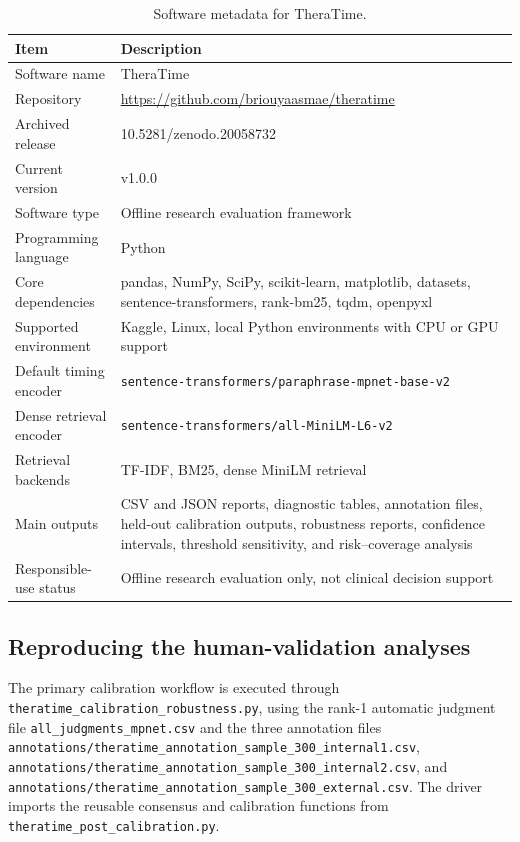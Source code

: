 \documentclass[preprint,12pt,a4paper]{elsarticle}
\newcommand{\theratimeRepository}{\url{https://github.com/briouyaasmae/theratime}}
\newcommand{\theratimeZenodo}{10.5281/zenodo.20058732}
\begin{document}
\begin{table}
\centering
\footnotesize
\caption{Software metadata for TheraTime.}
\label{tab:metadata}
\setlength{\tabcolsep}{6pt}
\renewcommand{\arraystretch}{1.2}
\begin{tabular}{p{3.7cm} p{8.2cm}}
\toprule
Item & Description \\
\midrule
Software name & TheraTime \\
Repository & \theratimeRepository{} \\
Archived release & \theratimeZenodo{} \\
Current version & v1.0.0 \\
Software type & Offline research evaluation framework \\
Programming language & Python \\
Core dependencies & pandas, NumPy, SciPy, scikit-learn, matplotlib, datasets, sentence-transformers, rank-bm25, tqdm, openpyxl \\
Supported environment & Kaggle, Linux, local Python environments with CPU or GPU support \\
Default timing encoder & \texttt{sentence-transformers/paraphrase-mpnet-base-v2} \\
Dense retrieval encoder & \texttt{sentence-transformers/all-MiniLM-L6-v2} \\
Retrieval backends & TF-IDF, BM25, dense MiniLM retrieval \\
Main outputs & CSV and JSON reports, diagnostic tables, annotation files, held-out calibration outputs, robustness reports, confidence intervals, threshold sensitivity, and risk--coverage analysis \\
Responsible-use status & Offline research evaluation only, not clinical decision support \\
\bottomrule
\end{tabular}
\end{table}

\FloatBarrier


\subsection{Reproducing the human-validation analyses}

The primary calibration workflow is executed through
\texttt{theratime\_calibration\_robustness.py}, using the rank-1 automatic
judgment file \texttt{all\_judgments\_mpnet.csv} and the three annotation
files \texttt{annotations/theratime\_annotation\_sample\_300\_internal1.csv},
\texttt{annotations/theratime\_annotation\_sample\_300\_internal2.csv}, and
\texttt{annotations/theratime\_annotation\_sample\_300\_external.csv}. The driver imports the reusable
consensus and calibration functions from
\texttt{theratime\_post\_calibration.py}.
\end{document}
